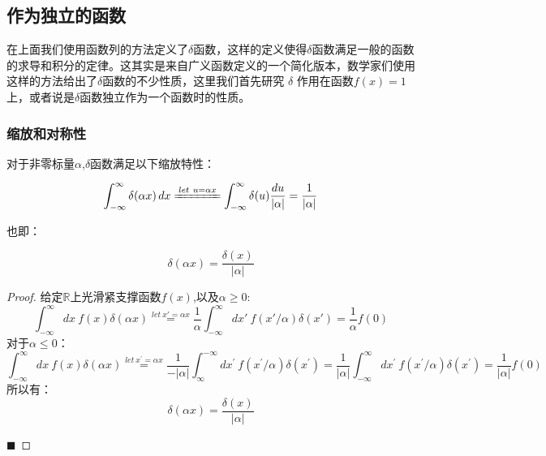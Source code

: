 \documentclass[lang=cn,10pt,newtx,bibend=biber,device=pad]{elegantbook}
\begin{document}
\subsection{作为独立的函数}
在上面我们使用函数列的方法定义了$\delta$函数，这样的定义使得$\delta$函数满足一般的函数的求导和积分的定律。这其实是来自广义函数定义的一个简化版本，数学家们使用这样的方法给出了$\delta$函数的不少性质，这里我们首先研究 $\delta$ 作用在函数$f(x)=1$上，或者说是$\delta$函数独立作为一个函数时的性质。

\subsubsection{缩放和对称性}\cite{strichartz1994distribution}

对于非零标量$\alpha$,$\delta$函数满足以下缩放特性：
\begin{property}
\begin{equation}
    \int_{-\infty}^{\infty} \delta(\alpha x) \, dx 
    \xlongequal{let\ u = \alpha x}
    \int_{-\infty}^{\infty} \delta(u) \frac{du}{|\alpha|} 
    = \frac{1}{|\alpha|}
\end{equation}

也即：

\begin{equation}
\delta(\alpha x) = \frac{\delta(x)}{|\alpha|}
\end{equation}
\end{property}
\begin{proof}
给定$\mathbb{R}$上光滑紧支撑函数$f(x)$,以及$\alpha\ge 0$:
\begin{equation}
    \int_{-\infty}^{\infty} dx\ f(x)\delta(\alpha x) \overset{let \ x'=\alpha x}{=}\frac{1}{\alpha}\int_{-\infty}^{\infty} dx'\ f(x'/\alpha)\delta(x') = \frac{1}{\alpha}f(0)
\end{equation}
对于$\alpha\le0$：
\begin{equation}
    \int_{-\infty}^{\infty}dx\ f(x)\delta(\alpha x)\overset{let\ x^{\prime}=\alpha x}{=}\frac{1}{-|\alpha|}\int_{\infty}^{-\infty}dx^{\prime}\ f(x^{\prime}/\alpha)\delta(x^{\prime})=\frac{1}{|\alpha|}\int_{-\infty}^{\infty}dx^{\prime}\ f(x^{\prime}/\alpha)\delta(x^{\prime})=\frac{1}{|\alpha|}f(0)
\end{equation}
所以有：
\begin{equation}
    \delta(\alpha x) = \frac{\delta(x)}{|\alpha|}
\end{equation}

$\blacksquare$
\end{proof}
\end{document}
